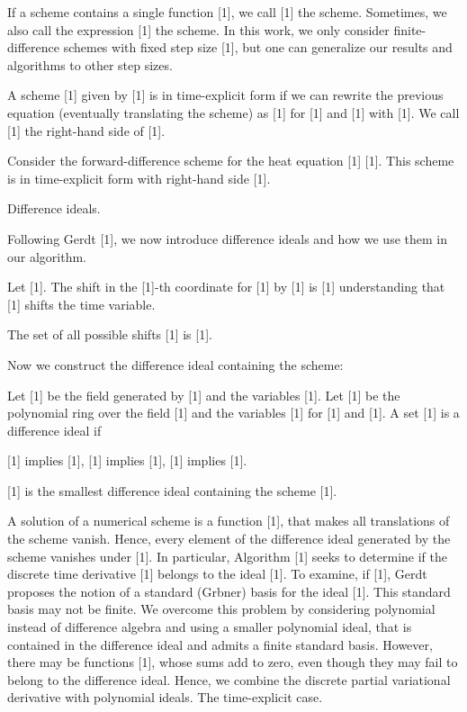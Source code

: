 \documentclass{article}
\begin{document}
If a scheme contains a single function [1], we call [1] the scheme. Sometimes, we also call the expression [1] the scheme.
In this work, we only consider finite-difference schemes with fixed step size [1], but one can generalize our results and algorithms to other step sizes.

	A scheme [1] given by
	[1]
	is in time-explicit form if we can rewrite the previous equation (eventually translating the scheme) as
	[1]
	for [1] and [1]
	with [1]. We call [1] the right-hand side of [1].


	Consider the forward-difference scheme for the heat equation [1]
	[1].
	This scheme is in time-explicit form with right-hand side
	[1].

Difference ideals.


Following Gerdt [1], we now introduce difference ideals and how we use them in our algorithm.

	Let [1]. The shift in the [1]-th coordinate for [1] by [1] is
	[1]
	understanding that [1] shifts the time variable.


	The set of all possible shifts [1] is
	[1].

Now we construct the difference ideal containing the scheme:

	
	Let [1] be the field generated by [1] and the variables [1]. Let [1] be the polynomial ring over the field [1] and the variables [1] for [1] and [1].
	A set [1] is a difference ideal if
	
		 [1] implies [1],
		 [1] implies [1],
		 [1] implies [1].
	


	[1] is the smallest difference ideal containing the scheme [1].

A solution of a numerical scheme is a function [1], that makes all translations of the scheme vanish. Hence, every element of the difference ideal generated by the scheme vanishes under [1].
In particular, Algorithm [1] seeks to determine if the discrete time derivative [1] belongs to the ideal [1]. To examine, if [1], Gerdt proposes the notion of a standard (Gr{}bner) basis for the ideal [1]. This standard basis may not be finite. We overcome this problem by considering polynomial instead of difference algebra and using a smaller polynomial ideal, that is contained in the difference ideal and admits a finite standard basis.
However, there may be functions [1], whose sums add to zero, even though they may fail to belong to the difference ideal. Hence, we combine the discrete partial variational derivative with polynomial ideals.
The time-explicit case.
\end{document}
